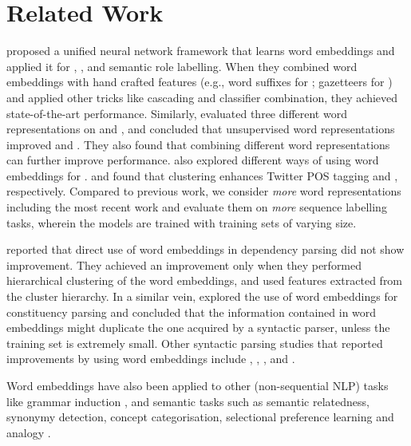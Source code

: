 \section{Related Work}

 proposed a unified neural network framework
that learns word embeddings and applied it for \pos, \chunking, \ner and semantic role labelling. 
When they combined word embeddings with hand crafted features
(e.g., word suffixes for \pos;  gazetteers for \ner) and applied other
tricks like cascading and classifier combination, they achieved state-of-the-art performance.
Similarly,  evaluated three different word representations on \ner and \chunking, and concluded that unsupervised word representations improved \ner and \chunking. They also found that combining different word representations can further improve performance.  also explored different ways of using word embeddings for \ner.   and  found that \brown clustering enhances Twitter POS tagging and \mwe, respectively. Compared to previous work, we consider \textit{more} word representations including the most recent work and evaluate them on \textit{more} sequence labelling tasks, wherein the models are trained with training sets of varying size.

 reported that direct use of word embeddings in dependency parsing did not show improvement. They achieved an improvement only when they performed hierarchical clustering of the word embeddings, and used features extracted from the cluster hierarchy.
In a similar vein,  explored the use of word embeddings for constituency parsing and concluded that the
information contained in word embeddings might duplicate the one acquired by a
syntactic parser, unless the training set is extremely small.
Other syntactic parsing studies that reported improvements by using
word embeddings include , ,
,  and .

Word embeddings have also been applied to other (non-sequential NLP)
tasks like grammar induction \cite{Spitkovsky:2011}, and semantic tasks
such as semantic relatedness, synonymy detection, concept
categorisation, selectional preference learning and analogy \cite{baroni:2014}.

